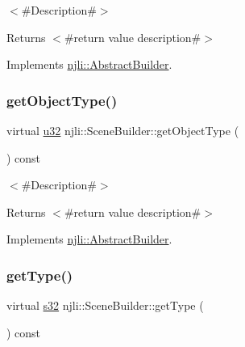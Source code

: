 $<$\#\+Description\#$>$

\begin{DoxyReturn}{Returns}
$<$\#return value description\#$>$ 
\end{DoxyReturn}


Implements \mbox{\hyperlink{classnjli_1_1_abstract_builder_a902f73ea78031b06aca183a417f3413b}{njli\+::\+Abstract\+Builder}}.

\mbox{\label{classnjli_1_1_scene_builder_a6130751ce0ea6cf1cde422405fa03496}} 
\subsubsection{\texorpdfstring{get\+Object\+Type()}{getObjectType()}}
{\footnotesize\ttfamily virtual \mbox{\hyperlink{_util_8h_a10e94b422ef0c20dcdec20d31a1f5049}{u32}} njli\+::\+Scene\+Builder\+::get\+Object\+Type (\begin{DoxyParamCaption}{ }\end{DoxyParamCaption}) const\hspace{0.3cm}{\ttfamily [virtual]}}

$<$\#\+Description\#$>$

\begin{DoxyReturn}{Returns}
$<$\#return value description\#$>$ 
\end{DoxyReturn}


Implements \mbox{\hyperlink{classnjli_1_1_abstract_builder_a0f2d344fcf697b167f4f2b1122b5fb33}{njli\+::\+Abstract\+Builder}}.

\mbox{\label{classnjli_1_1_scene_builder_aa5ba585a6ddf1b6a329339c8ba2e87f6}} 
\subsubsection{\texorpdfstring{get\+Type()}{getType()}}
{\footnotesize\ttfamily virtual \mbox{\hyperlink{_util_8h_aa62c75d314a0d1f37f79c4b73b2292e2}{s32}} njli\+::\+Scene\+Builder\+::get\+Type (\begin{DoxyParamCaption}{ }\end{DoxyParamCaption}) const\hspace{0.3cm}{\ttfamily [virtual]}}


